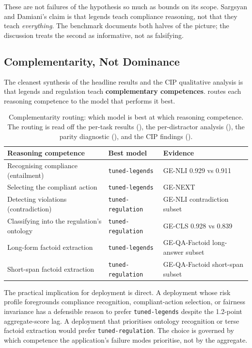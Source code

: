 \documentclass[pdflatex, sn-apa]{sn-jnl}%
\theoremstyle{thmstyleone}%
\theoremstyle{thmstyletwo}%
\theoremstyle{thmstylethree}%
\newcommand{\modellegends}{\texttt{tuned-legends}}
\newcommand{\modelreg}{\texttt{tuned-regulation}}
\begin{document}
These are not failures of the hypothesis so much as bounds on its scope.
Sargsyan and Damiani's claim is that legends teach compliance reasoning, not
that they teach \emph{everything}. The benchmark documents both halves of the
picture; the discussion treats the second as informative, not as falsifying.

\subsection{Complementarity, Not Dominance}
\label{sec:disc:complementarity}

The cleanest synthesis of the headline results and the CIP qualitative analysis
is that legends and regulation teach \textbf{complementary competences}.
 routes each reasoning competence to the model that
performs it best.

\begin{table}[h]
\centering
\caption{Complementarity routing: which model is best at which reasoning
competence. The routing is read off the per-task results (),
the per-distractor analysis (), the parity diagnostic
(), and the CIP findings ().}
\label{tab:complementarity}
\small
\begin{tabular}{@{}lll@{}}
\toprule
Reasoning competence                          & Best model         & Evidence \\
\midrule
Recognising compliance (entailment)           & \modellegends      & GE-NLI
0.929 vs 0.911 \\
Selecting the compliant action                & \modellegends      & GE-NEXT \\
Detecting violations (contradiction)          & \modelreg          & GE-NLI
contradiction subset \\
Classifying into the regulation's ontology    & \modelreg          & GE-CLS
0.928 vs 0.839 \\
Long-form factoid extraction                  & \modellegends      &
GE-QA-Factoid long-answer subset \\
Short-span factoid extraction                 & \modelreg          &
GE-QA-Factoid short-span subset \\
\bottomrule
\end{tabular}
\end{table}

The practical implication for deployment is direct. A deployment whose risk
profile foregrounds compliance recognition, compliant-action selection, or
fairness invariance has a defensible reason to prefer \modellegends{} despite
the 1.2-point aggregate-score lag. A deployment that prioritises ontology
recognition or terse factoid extraction would prefer \modelreg. The choice is
governed by which competence the application's failure modes prioritise, not by
the aggregate.
\end{document}
